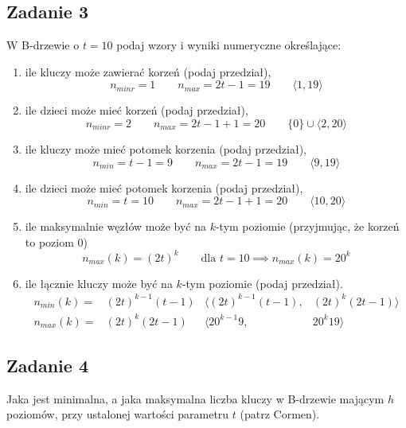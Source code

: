 \documentclass{article}
\begin{document}
\subsection*{Zadanie 3}
W B-drzewie o $t=10$ podaj wzory i wyniki numeryczne określające:
\begin{enumerate}[label=(\alph*)]
    \item ile kluczy może zawierać korzeń (podaj przedział),
          \begin{equation*}
              n_{minr} = 1 \qquad n_{max} = 2t-1 = 19 \qquad \langle 1, 19 \rangle
          \end{equation*}
    \item ile dzieci może mieć korzeń (podaj przedział),
          \begin{equation*}
              n_{minr} = 2 \qquad n_{max} = 2t-1+1 = 20 \qquad \{0\} \cup \langle 2, 20 \rangle
          \end{equation*}
    \item ile kluczy może mieć potomek korzenia (podaj przedział),
          \begin{equation*}
              n_{min} = t-1 = 9 \qquad n_{max} = 2t-1 = 19 \qquad \langle 9, 19 \rangle
          \end{equation*}
    \item ile dzieci może mieć potomek korzenia (podaj przedział),
          \begin{equation*}
              n_{min} = t = 10 \qquad n_{max} = 2t-1+1 = 20 \qquad \langle 10, 20 \rangle
          \end{equation*}
    \item ile maksymalnie węzłów może być na $k$-tym poziomie (przyjmując, że korzeń to poziom $0$)
          \begin{equation*}
              n_{max}(k) = (2t)^k \qquad \text{dla } t=10 \implies n_{max}(k) = 20^k
          \end{equation*}
    \item ile łącznie kluczy może być na $k$-tym poziomie (podaj przedział).
          \begin{align*}
              n_{min}(k) = & (2t)^{k-1}(t-1) & \langle (2t)^{k-1}(t-1), & (2t)^k(2t-1) \rangle \\
              n_{max}(k) = & (2t)^k(2t-1)    & \langle 20^{k-1}9,       & 20^k19 \rangle
          \end{align*}
\end{enumerate}

\subsection*{Zadanie 4}
Jaka jest minimalna, a jaka maksymalna liczba kluczy w B-drzewie mającym $h$ poziomów, przy ustalonej wartości
parametru $t$ (patrz Cormen).
\end{document}
